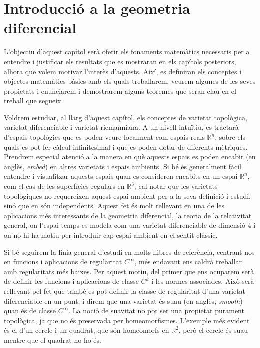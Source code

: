 \chapter{Introducció a la geometria diferencial}\label{cap:intro}

L'objectiu d'aquest capítol serà oferir els fonaments matemàtics necessaris per a entendre i justificar els resultats que es mostraran en els capítols posteriors, alhora que volem motivar l'interès d'aquests. Així, es definiran els conceptes i objectes matemàtics bàsics amb els quals treballarem, veurem algunes de les seves propietats i enunciarem i demostrarem alguns teoremes que seran clau en el treball que segueix.

Voldrem estudiar, al llarg d'aquest capítol, els conceptes de varietat topològica, varietat diferenciable i varietat riemanniana. A un nivell intuïtiu, es tractarà d'espais topològics que es poden veure localment com espais reals $\mathbb R^n$, sobre els quals es pot fer càlcul infinitesimal i que es poden dotar de diferents mètriques. Prendrem especial atenció a la manera en què aquests espais es poden encabir (en anglès, \textit{embed}) en altres varietats i espais ambients. Si bé és generalment fàcil entendre i visualitzar aquests espais quan es consideren encabits en un espai $\mathbb R^n$, com el cas de les superfícies regulars en $\mathbb R^3$, cal notar que les varietats topològiques no requereixen aquest espai ambient per a la seva definició i estudi, sinó que en són independents. Aquest fet és molt rellevant en una de les aplicacions més interessants de la geometria diferencial, la teoria de la relativitat general, on l'espai-temps es modela com una varietat diferenciable de dimensió 4 i on no hi ha motiu per introduir cap espai ambient en el sentit clàssic.

Si bé seguirem la línia general d'estudi en molts llibres de referència, centrant-nos en funcions i aplicacions de regularitat $C^\infty$, més endavant ens caldrà treballar amb regularitats més baixes. Per aquest motiu, del primer que ens ocuparem serà de definir les funcions i aplicacions de classe $C^k$ i les normes associades. Això serà rellevant pel fet que també es pot definir la classe de regularitat d'una varietat diferenciable en un punt, i direm que una varietat és suau (en anglès, \textit{smooth}) quan és de classe $C^\infty$. La noció de suavitat no pot ser una propietat purament topològica, ja que no és preservada per homeomorfismes. L'exemple més evident és el d'un cercle i un quadrat, que són homeomorfs en $\mathbb R^2$, però el cercle és suau mentre que el quadrat no ho és. 

